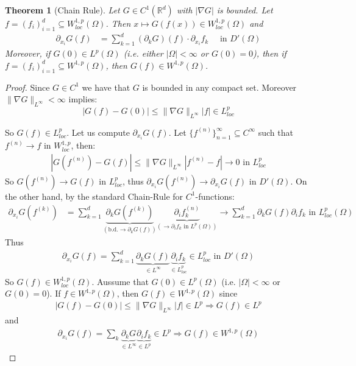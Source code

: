 \documentclass{report}
\theoremstyle{tommy}
\newtheorem{thm}[defn]{Theorem}
\begin{document}
  \begin{thm}[Chain Rule]
    Let \(G \in C^1(\mathbb{R}^d)\) with \(|\nabla G|\) is bounded. Let \(f = (f_i)_{i=1}^d \subseteq W_{loc}^{1,p}(\Omega)\). Then \(x \mapsto G(f(x)) \in W_{loc}^{1,p}(\Omega)\) and
    \begin{align*}
      \partial_{x_i} G(f)
      &= \sum_{k=1}^d (\partial_k G)(f) \cdot \partial_{x_i} f_k \quad \text{ in } D'(\Omega)
    \end{align*}
    Moreover, if \(G(0) \in L^p(\Omega)\) (i.e. either \(|\Omega| < \infty\) or \(G(0) = 0\)), then if \(f = (f_i)_{i=1}^d \subseteq W^{1,p}(\Omega)\), then \(G(f) \in W^{1,p}(\Omega)\).
  \end{thm}

  \begin{proof}
    Since \(G \in C^1\) we have that \(G\) is bounded in any compact set. Moreover \(\|\nabla G\|_{L^\infty} < \infty\) implies:
    \[|G(f) - G(0)| \le \|\nabla G\|_{L^\infty} |f| \in L^p_{loc}\]
  
    So \(G(f) \in L_{loc}^p\). Let us compute \(\partial_{x_i} G(f)\). Let \(\{f^{(n)}\}_{n=1}^\infty \subseteq C^\infty\) such that \(f^{(n)} \to f\) in \(W_{loc}^{1,p}\), then: 
    \begin{align*}
      |G(f^{(n)}) - G(f)|
      \le \|\nabla G\|_{L^\infty} |f^{(n)} - f| \to 0 \text{ in  \(L_{loc}^p\)}
    \end{align*}
    So \(G(f^{(n)}) \to G(f)\) in \(L_{loc}^p\), thus \(\partial_{x_i} G(f^{(n)}) \to \partial_{x_i} G(f)\) in \(D'(\Omega)\). On the other hand, by the standard Chain-Rule for \(C^1\)-functions:
    \begin{align*}
      \partial_{x_i} G(f^{(k)})
      &= \sum_{k=1}^d \underbrace{\partial_k G(f^{(k)})}_{(\text{b.d.} \to \partial_k G(f))} \underbrace{\partial_i f_k^{(n)}}_{(\to \partial_i f_k \text{ in } L^p(\Omega))} \to \sum_{k=1}^d \partial_k G(f) \partial_i f_k \text{ in }L_{loc}^p(\Omega)
    \end{align*}
    Thus
    \begin{align*}
      \partial_{x_i} G(f) = \sum_{k=1}^d \underbrace{\partial_k G(f)}_{\in L^\infty} \underbrace{\partial_i f_k}_{\in L_{loc}^p} \in L_{loc}^p \text{ in } D'(\Omega)
    \end{align*}
    So \(G(f) \in W_{loc}^{1,p}(\Omega)\). Aussume that \(G(0) \in L^p(\Omega)\) (i.e. \(|\Omega| < \infty\) or \(G(0) = 0\)). If \(f \in W^{1,p}(\Omega)\), then \(G(f) \in W^{1,p}(\Omega)\) since
    \begin{align*}
      |G(f) - G(0) | \le \|\nabla G\|_{L^\infty} |f| \in L^p \Rightarrow G(f) \in L^p
    \end{align*}
    and 
    \begin{align*}
      \partial_{x_i} G(f) = \sum_k \underbrace{\partial_k G}_{\in L^\infty} \underbrace{\partial_i f_k}_{\in L^p} \in L^p \Rightarrow G(f) \in W^{1,p}(\Omega)
    \end{align*}
  \end{proof}
  
\end{document}
